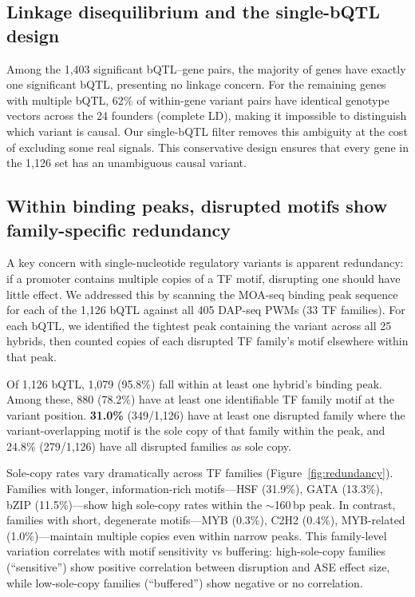 \documentclass[11pt,a4paper]{article}
\begin{document}
\subsection{Linkage disequilibrium and the single-bQTL design}

Among the 1,403 significant bQTL--gene pairs, the majority of genes have
exactly one significant bQTL, presenting no linkage concern. For the
remaining genes with multiple bQTL, 62\% of within-gene variant pairs have
identical genotype vectors across the 24 founders (complete LD), making it
impossible to distinguish which variant is causal. Our single-bQTL filter
removes this ambiguity at the cost of excluding some real signals. This
conservative design ensures that every gene in the 1,126 set has an
unambiguous causal variant.


\subsection{Within binding peaks, disrupted motifs show family-specific redundancy}
\label{sec:redundancy}

A key concern with single-nucleotide regulatory variants is apparent
redundancy: if a promoter contains multiple copies of a TF motif, disrupting
one should have little effect. We addressed this by scanning the MOA-seq
binding peak sequence for each of the 1,126 bQTL against all 405 DAP-seq PWMs
(33 TF families). For each bQTL, we identified the tightest peak containing
the variant across all 25 hybrids, then counted copies of each disrupted TF
family's motif elsewhere within that peak.

Of 1,126 bQTL, 1,079 (95.8\%) fall within at least one hybrid's binding peak.
Among these, 880 (78.2\%) have at least one identifiable TF family motif at
the variant position. \textbf{31.0\%} (349/1,126) have at least one disrupted
family where the variant-overlapping motif is the sole copy of that family
within the peak, and 24.8\% (279/1,126) have all disrupted families as sole
copy.

Sole-copy rates vary dramatically across TF families
(Figure~\ref{fig:redundancy}). Families with longer, information-rich
motifs---HSF (31.9\%), GATA (13.3\%), bZIP (11.5\%)---show high
sole-copy rates within the ${\sim}$160\,bp peak. In contrast, families with
short, degenerate motifs---MYB (0.3\%), C2H2 (0.4\%), MYB-related
(1.0\%)---maintain multiple copies even within narrow peaks. This
family-level variation correlates with motif sensitivity vs buffering:
high-sole-copy families (``sensitive'') show positive correlation between
disruption and ASE effect size, while low-sole-copy families
(``buffered'') show negative or no correlation.
\end{document}
